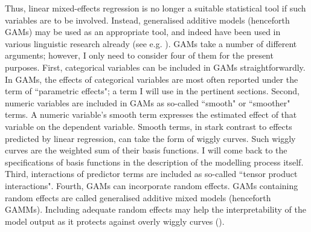 Thus, linear mixed-effects regression is no longer a suitable statistical tool if such variables are to be involved. Instead, generalised additive models (henceforth GAMs) may be used as an appropriate tool, and indeed have been used in various linguistic research already (see e.g. \cite{Wieling2011, Linke2017, Milin2017, Tomaschek2018b}). GAMs take a number of different arguments; however, I only need to consider four of them for the present purposes. First, categorical variables can be included in GAMs straightforwardly. In GAMs, the effects of categorical variables are most often reported under the term of ``parametric effects"; a term I will use in the pertinent sections. Second, numeric variables are included in GAMs as so-called ``smooth" or ``smoother" terms. A numeric variable’s smooth term expresses the estimated effect of that variable on the dependent variable. Smooth terms, in stark contrast to effects predicted by linear regression, can take the form of wiggly curves. Such wiggly curves are the weighted sum of their basis functions. I will come back to the specifications of basis functions in the description of the modelling process itself. Third, interactions of predictor terms are included as so-called ``tensor product interactions". Fourth, GAMs can incorporate random effects. GAMs containing random effects are called generalised additive mixed models (henceforth GAMMs). Including adequate random effects may help the interpretability of the model output as it protects against overly wiggly curves (\cite{Baayen2020}).

